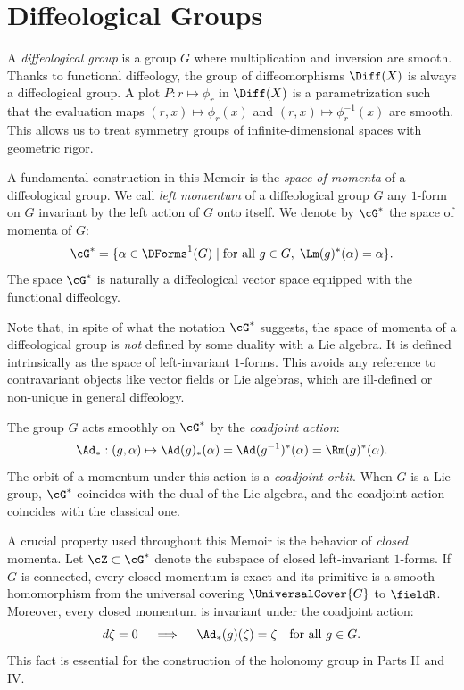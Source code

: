 \section{Diffeological Groups}
\label{sec:Diffeological Groups}

A \emph{diffeological group} is a group $G$ where multiplication and inversion are smooth.
Thanks to functional diffeology,
the group of diffeomorphisms $\Diff(X)$ is always a diffeological group.
A plot $P:r \mapsto \phi_r$ in $\Diff(X)$ is a parametrization such that the evaluation maps $(r,x) \mapsto \phi_r(x)$ and $(r,x) \mapsto \phi_r^{-1}(x)$ are smooth.
This allows us to treat symmetry groups of infinite-dimensional spaces with geometric rigor.

\begin{article}
  \label{subsec:Momenta}
  A fundamental construction in this Memoir is the \emph{space of momenta} of a diffeological group.
  We call \emph{left momentum} of a diffeological group $G$ any $1$-form on $G$ invariant by the left action of $G$ onto itself.
  We denote by $\cG^*$ the space of momenta of $G$:
  \[
    \cG^* = \{ \alpha \in \DForms^1(G) \mid \text{for all } g \in G, \; \Lm(g)^*(\alpha) = \alpha \}.
    \]
  The space $\cG^*$ is naturally a diffeological vector space equipped with the functional diffeology.
  
  Note that,
  in spite of what the notation $\cG^*$ suggests,
  the space of momenta of a diffeological group is \emph{not} defined by some duality with a Lie algebra.
  It is defined intrinsically as the space of left-invariant $1$-forms.
  This avoids any reference to contravariant objects like vector fields or Lie algebras,
  which are ill-defined or non-unique in general diffeology.
  
  The group $G$ acts smoothly on $\cG^*$ by the \emph{coadjoint action}:
  \[
    \Ad_* : (g,\alpha) \mapsto \Ad(g)_*(\alpha) = \Ad(g^{-1})^*(\alpha) = \Rm(g)^*(\alpha).
    \]
  The orbit of a momentum under this action is a \emph{coadjoint orbit}.
  When $G$ is a Lie group,
  $\cG^*$ coincides with the dual of the Lie algebra,
  and the coadjoint action coincides with the classical one.
  
  A crucial property used throughout this Memoir is the behavior of \emph{closed} momenta.
  Let $\cZ \subset \cG^*$ denote the subspace of closed left-invariant $1$-forms.
  If $G$ is connected,
  every closed momentum is exact and its primitive is a smooth homomorphism from the universal covering $\UniversalCover{G}$ to $\fieldR$.
  Moreover,
  every closed momentum is invariant under the coadjoint action:
  \[
    d\zeta = 0 \quad\implies\quad \Ad_*(g)(\zeta) = \zeta \quad \text{for all } g \in G.
    \]
  This fact is essential for the construction of the holonomy group in Parts II and IV.
\end{article}

